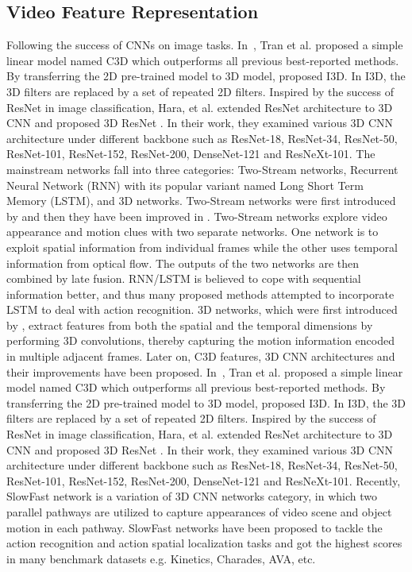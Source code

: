 \documentclass{ieeeaccess}
\begin{document}
\subsection{Video Feature Representation}

Following the success of CNNs on image tasks. In~\cite{tran2015learning}, Tran et al. proposed a simple linear model named C3D which outperforms all previous best-reported methods. By transferring the 2D pre-trained model to 3D model, \cite{i3d_2017} proposed I3D. In I3D, the 3D filters are replaced by a set of repeated 2D filters. Inspired by the success of ResNet in image classification, Hara, et al. extended ResNet architecture to 3D CNN and proposed 3D ResNet \cite{resnet3D_50}. In their work, they examined various 3D CNN architecture under different backbone such as ResNet-18, ResNet-34, ResNet-50, ResNet-101, ResNet-152, ResNet-200, DenseNet-121 and ResNeXt-101.  The mainstream networks fall into three categories: Two-Stream networks, Recurrent Neural Network (RNN) with its popular variant named Long Short Term Memory (LSTM), and 3D networks. Two-Stream networks were first introduced by \cite{2_stream_1} and then they have been improved in \cite{2_stream_2}. Two-Stream networks explore video appearance and motion clues with two separate networks. One network is to exploit spatial information from individual frames while the other uses temporal information from optical flow. The outputs of the two networks are then combined by late fusion. RNN/LSTM is believed to cope with sequential information better, and thus many proposed methods \cite{LSTM_1, LSTM_2} attempted to incorporate LSTM to deal with action recognition. 3D networks, which were first introduced by \cite{C3D}, extract features from both the spatial and the temporal dimensions by performing 3D convolutions, thereby capturing the motion information encoded in multiple adjacent frames. Later on, C3D features, 3D CNN architectures and their improvements \cite{C3D_2, C3D_3, c3D_4, c3D_5, i3d_2017, resnet3D_50} have been proposed. In~\cite{tran2015learning}, Tran et al. proposed a simple linear model named C3D which outperforms all previous best-reported methods. By transferring the 2D pre-trained model to 3D model, \cite{i3d_2017} proposed I3D. In I3D, the 3D filters are replaced by a set of repeated 2D filters. Inspired by the success of ResNet in image classification, Hara, et al. extended ResNet architecture to 3D CNN and proposed 3D ResNet \cite{resnet3D_50}. In their work, they examined various 3D CNN architecture under different backbone such as ResNet-18, ResNet-34, ResNet-50, ResNet-101, ResNet-152, ResNet-200, DenseNet-121 and ResNeXt-101. Recently, SlowFast network \cite{SlowFast} is a variation of 3D CNN networks category, in which two parallel pathways are utilized to capture appearances of video scene and object motion in each pathway. SlowFast networks have been proposed to tackle the action recognition and action spatial localization tasks and got the highest scores in many benchmark datasets e.g. Kinetics, Charades, AVA, etc.
\end{document}
